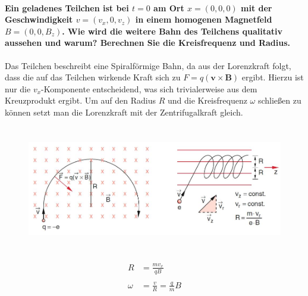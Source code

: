 \documentclass[a4paper, 11pt, ngerman, parskip=half-]{scrartcl}
\begin{document}
\paragraph{Ein geladenes Teilchen ist bei $t=0$ am Ort $x=(0,0,0)$ mit der Geschwindigkeit
    $v=(v_x,0,v_z)$ in einem homogenen Magnetfeld $B=(0,0,B_z)$. Wie wird die weitere Bahn des Teilchens
    qualitativ aussehen und warum? Berechnen Sie die Kreisfrequenz und Radius.}
Das Teilchen beschreibt eine Spiralförmige Bahn, da aus der Lorenzkraft folgt, dass die auf das Teilchen wirkende Kraft sich zu $F = q(\textbf{v} \times \textbf{B})$ ergibt.
Hierzu ist nur die $v_x$-Komponente entscheidend, was sich trivialerweise aus dem Kreuzprodukt ergibt. Um auf den Radius $R$ und die Kreisfrequenz $\omega$ schließen zu können setzt man die Lorenzkraft mit der Zentrifugalkraft gleich.
\begin{figure}[H]
    \centering
    \includegraphics[height=5.5cm]{image/05/5.6.JPG}
\end{figure}
\begin{align}
    R      & = \frac{mv_x}{qB}             \\
    \\
    \omega & = \frac{v}{R} = \frac{q}{m} B
\end{align}
\end{document}
